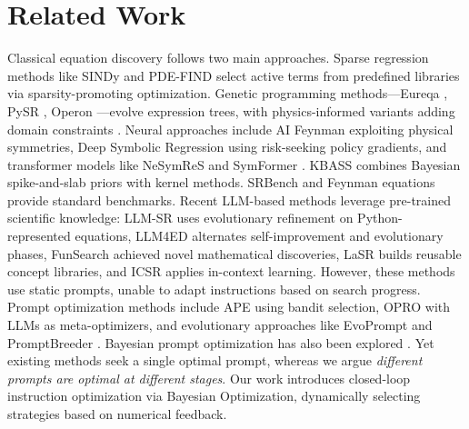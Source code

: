 \section{Related Work}

Classical equation discovery follows two main approaches. Sparse regression methods like SINDy \cite{brunton2016sindy,messenger2021weak,fasel2022ensemble} and PDE-FIND \cite{rudy2017pdefind} select active terms from predefined libraries via sparsity-promoting optimization. Genetic programming methods—Eureqa \cite{schmidt2009eureqa}, PySR \cite{cranmer2023pysr}, Operon \cite{burlacu2020operon}—evolve expression trees, with physics-informed variants adding domain constraints \cite{zhang2024pigp}. Neural approaches include AI Feynman \cite{udrescu2020aifeynman,udrescu2020aifeynman2,kamienny2022e2e,mundhenk2021seeding,landajuela2022udsr} exploiting physical symmetries, Deep Symbolic Regression \cite{petersen2021dsr} using risk-seeking policy gradients, and transformer models like NeSymReS \cite{biggio2021nesymres} and SymFormer \cite{vastl2022symformer}. KBASS \cite{long2023kbass} combines Bayesian spike-and-slab priors with kernel methods. SRBench \cite{lacava2021srbench} and Feynman equations \cite{udrescu2020aifeynman} provide standard benchmarks. Recent LLM-based methods leverage pre-trained scientific knowledge: LLM-SR \cite{shojaee2024llmsr,boiko2023coscientist,ma2024sga,zhang2024chemllm} uses evolutionary refinement on Python-represented equations, LLM4ED \cite{du2024llm4ed} alternates self-improvement and evolutionary phases, FunSearch \cite{romera2024funsearch} achieved novel mathematical discoveries, LaSR \cite{grayeli2024lasr} builds reusable concept libraries, and ICSR \cite{merler2024icsr} applies in-context learning. However, these methods use static prompts, unable to adapt instructions based on search progress. Prompt optimization methods include APE \cite{zhou2023ape} using bandit selection, OPRO \cite{yang2024opro} with LLMs as meta-optimizers, and evolutionary approaches like EvoPrompt \cite{guo2024evoprompt} and PromptBreeder \cite{fernando2024promptbreeder}. Bayesian prompt optimization has also been explored \cite{sabbatella2024promptbo}. Yet existing methods seek a single optimal prompt, whereas we argue \textit{different prompts are optimal at different stages}. Our work introduces closed-loop instruction optimization via Bayesian Optimization, dynamically selecting strategies based on numerical feedback.

